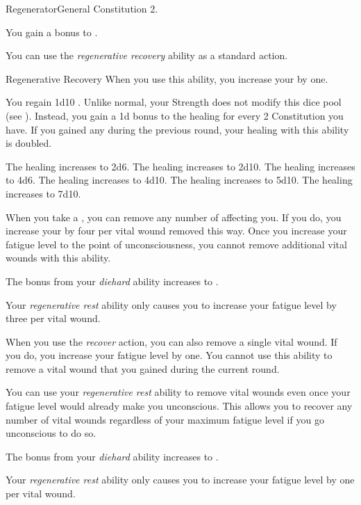     \begin{feat}{Regenerator}{General}
        \featpre Constitution 2.

         You gain a  bonus to .

         You can use the \textit{regenerative recovery} ability as a standard action.
        \begin{instantability}{Regenerative Recovery}
            \rankline
            When you use this ability, you increase your  by one.

            You regain 1d10 \add {} .
            Unlike normal, your Strength does not modify this dice pool (see ).
            Instead, you gain a \plus1d bonus to the healing for every 2 Constitution you have.
            If you gained any  during the previous round, your healing with this ability is doubled.

            \rankline
             The healing increases to 2d6.
             The healing increases to 2d10.
             The healing increases to 4d6.
             The healing increases to 4d10.
             The healing increases to 5d10.
             The healing increases to 7d10.
        \end{instantability}

         When you take a , you can remove any number of  affecting you.
        If you do, you increase your  by four per vital wound removed this way.
        Once you increase your fatigue level to the point of unconsciousness, you cannot remove additional vital wounds with this ability.

         The bonus from your \textit{diehard} ability increases to .

         Your \textit{regenerative rest} ability only causes you to increase your fatigue level by three per vital wound.

         When you use the \textit{recover} action, you can also remove a single vital wound.
        If you do, you increase your fatigue level by one.
        You cannot use this ability to remove a vital wound that you gained during the current round.

         You can use your \textit{regenerative rest} ability to remove vital wounds even once your fatigue level would already make you unconscious.
        This allows you to recover any number of vital wounds regardless of your maximum fatigue level if you go unconscious to do so.

         The bonus from your \textit{diehard} ability increases to .

         Your \textit{regenerative rest} ability only causes you to increase your fatigue level by one per vital wound.
    \end{feat}

